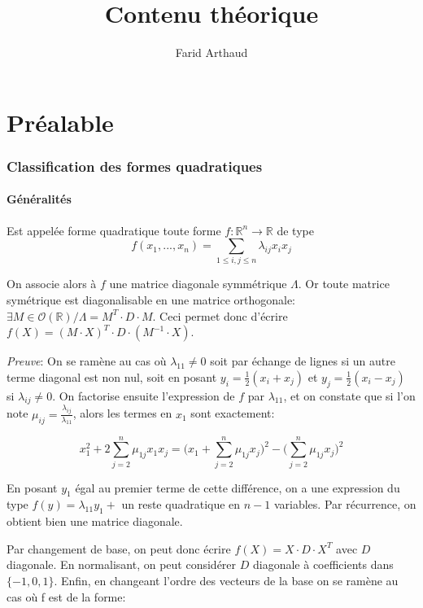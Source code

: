 \documentclass{article}
\begin{document}
\title{Contenu théorique}\author{Farid Arthaud}
\maketitle

\part{Préalable}

\section{Classification des formes quadratiques}

\subsection{Généralités}

Est appelée forme quadratique toute forme $f:\mathbb{R}^n\to\mathbb{R}$ de type $$f(x_1,...,x_n)=\sum_{1\leq i,j\leq n}\lambda_{ij}x_ix_j$$

On associe alors à $f$ une matrice diagonale symmétrique $\Lambda$. Or toute matrice symétrique est diagonalisable en une matrice orthogonale: $\exists M \in \mathcal{O}(\mathbb{R}) / \Lambda = M^T\cdot D\cdot M$. Ceci permet donc d'écrire $f(X) = (M\cdot X)^T\cdot D\cdot (M^{-1}\cdot X)$.

\textit{Preuve}: On se ramène au cas où $\lambda_{11} \neq 0$ soit par échange de lignes si un autre terme diagonal est non nul, soit en posant $y_i=\frac{1}{2}(x_i+x_j)$ et $y_j=\frac{1}{2}(x_i-x_j)$ si $\lambda_{ij}\neq 0$. On factorise ensuite l'expression de $f$ par $\lambda_{11}$, et on constate que si l'on note $\mu_{ij}=\frac{\lambda_{ij}}{\lambda_{11}}$, alors les termes en $x_1$ sont exactement:

$$x_1^2+2\sum_{j=2}^n \mu_{1j}x_1x_j=\big(x_1+\sum_{j=2}^n \mu_{1j}x_j\big)^2-\big(\sum_{j=2}^n \mu_{1j}x_j\big)^2$$

En posant $y_1$ égal au premier terme de cette différence, on a une expression du type $f(y)=\lambda_{11}y_1+$ un reste quadratique en $n-1$ variables. Par récurrence, on obtient bien une matrice diagonale.

Par changement de base, on peut donc écrire $f(X) = X\cdot D\cdot X^T$ avec $D$ diagonale. En normalisant, on peut considérer $D$ diagonale à coefficients dans $\{-1,0,1\}$. Enfin, en changeant l'ordre des vecteurs de la base on se ramène au cas où f est de la forme:
\end{document}
